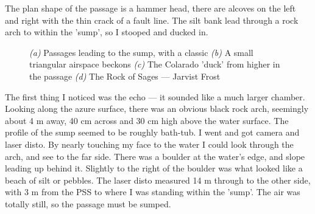 The plan shape of the passage is a hammer head, there are alcoves on the left and right with the thin crack of a fault line. The silt bank lead through a rock arch to within the 'sump', so I stooped and ducked in.
\begin{figure}[t]
\checkoddpage \ifoddpage \forcerectofloat \else \forceversofloat \fi
    \centering
    \begin{subfigure}[t]{0.345\textwidth}
    \centering
        \caption{} \label{Hourglass passage}
    \end{subfigure}
        \hfill
        \begin{subfigure}[t]{0.615\textwidth}
        \centering
        \caption{} \label{Colorado Duck}
    \end{subfigure}
          \vspace{0cm}
          
    \begin{subfigure}[t]{0.615\textwidth}
        \centering
        \caption{} \label{Colarado Sump}
    \end{subfigure}
    \hfill
    \begin{subfigure}[t]{0.345\textwidth}
\centering
{}
\label{Rock of Sages}
\end{subfigure}
    \caption{
    \textit{(a)} Passages leading to the sump, with a classic  
    \textit{(b)} A small triangular airspace beckons
    \textit{(c)}  The Colarado 'duck' from higher in the passage
    \textit{(d)} The Rock of Sages --- Jarvist Frost}
\end{figure}

The first thing I noticed was the echo --- it sounded like a much larger chamber. Looking along the azure surface, there was an obvious black rock arch, seemingly about 4 m away, 40 cm across and 30 cm high above the water surface. The profile of the sump seemed to be roughly bath-tub.
I went and got camera and laser disto. By nearly touching my face to the water I could look through the arch, and see to the far side. There was a boulder at the water's edge, and slope leading up behind it. Slightly to the right of the boulder was what looked like a beach of silt or pebbles. The laser disto measured 14 m through to the other side, with 3 m from the PSS to where I was standing within the 'sump'. The air was totally still, so the passage must be sumped.

